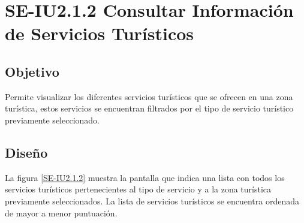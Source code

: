 \newpage
\section{SE-IU2.1.2 Consultar Información de Servicios Turísticos}

\subsection{Objetivo}
Permite visualizar los diferentes servicios turísticos que se ofrecen en una zona turística, estos servicios se encuentran filtrados por el tipo de servicio turístico previamente seleccionado.

\subsection{Diseño}
La figura \ref{SE-IU2.1.2} muestra la pantalla  que indica una lista con todos los servicios turísticos pertenecientes al tipo de servicio y a la zona turística previamente seleccionados. La lista de servicios turísticos se encuentra ordenada de mayor a menor puntuación.


